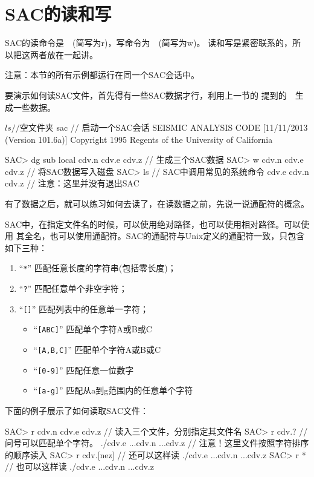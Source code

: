 \section{SAC的读和写}
\label{sec:read-and-write}
SAC的读命令是~~(简写为r)，写命令为~~(简写为w)。
读和写是紧密联系的，所以把这两者放在一起讲。

注意：本节的所有示例都运行在同一个SAC会话中。

要演示如何读SAC文件，首先得有一些SAC数据才行，利用上一节的
提到的~~生成一些数据。
\begin{SACCode}
$ ls                // 空文件夹
$ sac               // 启动一个SAC会话
 SEISMIC ANALYSIS CODE [11/11/2013 (Version 101.6a)]
 Copyright 1995 Regents of the University of California

SAC> dg sub local cdv.n cdv.e cdv.z     // 生成三个SAC数据
SAC> w cdv.n cdv.e cdv.z                // 将SAC数据写入磁盘
SAC> ls                                 // SAC中调用常见的系统命令
cdv.e  cdv.n  cdv.z
                                        // 注意：这里并没有退出SAC
\end{SACCode}

有了数据之后，就可以练习如何去读了，在读数据之前，先说一说通配符的概念。

SAC中，在指定文件名的时候，可以使用绝对路径，也可以使用相对路径。可以使用
其全名，也可以使用通配符。SAC的通配符与Unix定义的通配符一致，只包含如下三种：
\begin{enumerate}
\item ``\verb+*+'' 匹配任意长度的字符串(包括零长度)；
\item ``\verb+?+'' 匹配任意单个非空字符；
\item ``\verb+[]+'' 匹配列表中的任意单一字符；
    \begin{itemize}
        \item ``\verb+[ABC]+'' 匹配单个字符A或B或C
        \item ``\verb+[A,B,C]+'' 匹配单个字符A或B或C
        \item ``\verb+[0-9]+'' 匹配任意一位数字
        \item ``\verb+[a-g]+'' 匹配从a到g范围内的任意单个字符
    \end{itemize}
\end{enumerate}

下面的例子展示了如何读取SAC文件：
\begin{SACCode}
SAC> r cdv.n cdv.e cdv.z    // 读入三个文件，分别指定其文件名
SAC> r cdv.?                // 问号可以匹配单个字符。
./cdv.e ...cdv.n ...cdv.z   // 注意！这里文件按照字符排序的顺序读入
SAC> r cdv.[nez]            // 还可以这样读
./cdv.e ...cdv.n ...cdv.z
SAC> r *                    // 也可以这样读
./cdv.e ...cdv.n ...cdv.z
\end{SACCode}

